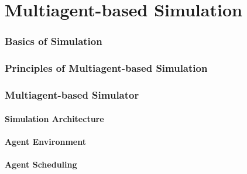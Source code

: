 \part[author={Prof.Dr. St\'ephane GALLAND}]{Multiagent-based Simulation}
\begin{bibliographysection}

	\section[Simulation Basics]{Basics of Simulation}
	

	\section[MABS Principles]{Principles of Multiagent-based Simulation}
	
	\section[MABS Simulator]{Multiagent-based Simulator}
	\subsection{Simulation Architecture}
	
	\subsection{Agent Environment}
	
	\subsection{Agent Scheduling}
	

	\thanksslide
\end{bibliographysection}


